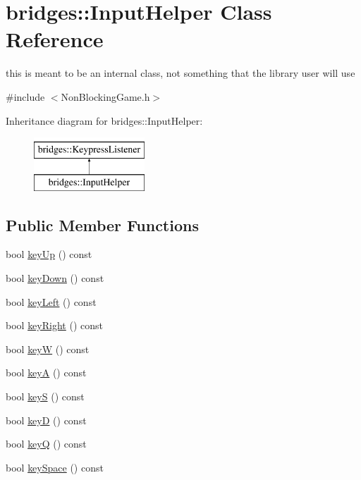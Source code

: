 \hypertarget{classbridges_1_1_input_helper}{}\section{bridges\+:\+:Input\+Helper Class Reference}
\label{classbridges_1_1_input_helper}


this is meant to be an internal class, not something that the library user will use  




{\ttfamily \#include $<$Non\+Blocking\+Game.\+h$>$}

Inheritance diagram for bridges\+:\+:Input\+Helper\+:\begin{figure}[H]
\begin{center}
\leavevmode
\includegraphics[height=2.000000cm]{classbridges_1_1_input_helper}
\end{center}
\end{figure}
\subsection*{Public Member Functions}
\begin{DoxyCompactItemize}
\item 
bool \hyperlink{classbridges_1_1_input_helper_a4af008528d2dcb4b985050c2945875fc}{key\+Up} () const
\item 
bool \hyperlink{classbridges_1_1_input_helper_ae40cf213430422a9d99791b6019bbd31}{key\+Down} () const
\item 
bool \hyperlink{classbridges_1_1_input_helper_a3ef3babb68c54e52212025b72de680ea}{key\+Left} () const
\item 
bool \hyperlink{classbridges_1_1_input_helper_aa55f7adc5ef71f39df21f29f16fa0e05}{key\+Right} () const
\item 
bool \hyperlink{classbridges_1_1_input_helper_add1c8bdaf86452d68f51ef9d795b3372}{keyW} () const
\item 
bool \hyperlink{classbridges_1_1_input_helper_a1e438ddcf6a4a91aed6093229fb9d981}{keyA} () const
\item 
bool \hyperlink{classbridges_1_1_input_helper_a5cbb4f7d017dff56d63cf29a652bf6a2}{keyS} () const
\item 
bool \hyperlink{classbridges_1_1_input_helper_a23d78e9b8b70b27514ec0ab891969d70}{keyD} () const
\item 
bool \hyperlink{classbridges_1_1_input_helper_ae023c494d4856b01a4b3083775147f76}{keyQ} () const
\item 
bool \hyperlink{classbridges_1_1_input_helper_a953d3315a7dfcad7efce8804b10d0af1}{key\+Space} () const
\end{DoxyCompactItemize}
